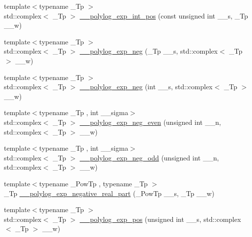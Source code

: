 \begin{DoxyCompactItemize}
\item 
{\footnotesize template$<$typename \+\_\+\+Tp $>$ }\\std\+::complex$<$ \+\_\+\+Tp $>$ \hyperlink{namespacestd_1_1____detail_ac87302233a0ea200b1fb9a2592da21e6}{\+\_\+\+\_\+polylog\+\_\+exp\+\_\+int\+\_\+pos} (const unsigned int \+\_\+\+\_\+s, \+\_\+\+Tp \+\_\+\+\_\+w)
\item 
{\footnotesize template$<$typename \+\_\+\+Tp $>$ }\\std\+::complex$<$ \+\_\+\+Tp $>$ \hyperlink{namespacestd_1_1____detail_a07b26b8c7ff467310e4e1df6e3efd893}{\+\_\+\+\_\+polylog\+\_\+exp\+\_\+neg} (\+\_\+\+Tp \+\_\+\+\_\+s, std\+::complex$<$ \+\_\+\+Tp $>$ \+\_\+\+\_\+w)
\item 
{\footnotesize template$<$typename \+\_\+\+Tp $>$ }\\std\+::complex$<$ \+\_\+\+Tp $>$ \hyperlink{namespacestd_1_1____detail_aac54584aa89fef6a08a258ad6e2a75f5}{\+\_\+\+\_\+polylog\+\_\+exp\+\_\+neg} (int \+\_\+\+\_\+s, std\+::complex$<$ \+\_\+\+Tp $>$ \+\_\+\+\_\+w)
\item 
{\footnotesize template$<$typename \+\_\+\+Tp , int \+\_\+\+\_\+sigma$>$ }\\std\+::complex$<$ \+\_\+\+Tp $>$ \hyperlink{namespacestd_1_1____detail_affdff8c867d264b62a64427e53f5b9aa}{\+\_\+\+\_\+polylog\+\_\+exp\+\_\+neg\+\_\+even} (unsigned int \+\_\+\+\_\+n, std\+::complex$<$ \+\_\+\+Tp $>$ \+\_\+\+\_\+w)
\item 
{\footnotesize template$<$typename \+\_\+\+Tp , int \+\_\+\+\_\+sigma$>$ }\\std\+::complex$<$ \+\_\+\+Tp $>$ \hyperlink{namespacestd_1_1____detail_a114ec67e6802a402064b16a9a77f0863}{\+\_\+\+\_\+polylog\+\_\+exp\+\_\+neg\+\_\+odd} (unsigned int \+\_\+\+\_\+n, std\+::complex$<$ \+\_\+\+Tp $>$ \+\_\+\+\_\+w)
\item 
{\footnotesize template$<$typename \+\_\+\+Pow\+Tp , typename \+\_\+\+Tp $>$ }\\\+\_\+\+Tp \hyperlink{namespacestd_1_1____detail_a466240361bcf30941d84a8fc3cd91cf9}{\+\_\+\+\_\+polylog\+\_\+exp\+\_\+negative\+\_\+real\+\_\+part} (\+\_\+\+Pow\+Tp \+\_\+\+\_\+s, \+\_\+\+Tp \+\_\+\+\_\+w)
\item 
{\footnotesize template$<$typename \+\_\+\+Tp $>$ }\\std\+::complex$<$ \+\_\+\+Tp $>$ \hyperlink{namespacestd_1_1____detail_a0327d2970eba3a0a2d73c71c7a77701c}{\+\_\+\+\_\+polylog\+\_\+exp\+\_\+pos} (unsigned int \+\_\+\+\_\+s, std\+::complex$<$ \+\_\+\+Tp $>$ \+\_\+\+\_\+w)
\item 

\end{DoxyCompactItemize}
